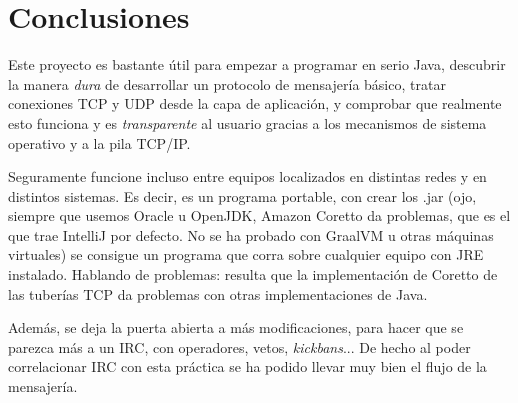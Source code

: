 \documentclass{article}
\begin{document}
\section{Conclusiones}

Este proyecto es bastante útil para empezar a programar en serio Java, descubrir la manera \textit{dura} de desarrollar un protocolo de mensajería básico, tratar conexiones TCP y UDP desde la capa de aplicación, y comprobar que realmente esto funciona y es \textit{transparente} al usuario gracias a los mecanismos de sistema operativo y a la pila TCP/IP.

Seguramente funcione incluso entre equipos localizados en distintas redes y en distintos sistemas. Es decir, es un programa portable, con crear los .jar (ojo, siempre que usemos Oracle u OpenJDK, Amazon Coretto da problemas, que es el que trae IntelliJ por defecto. No se ha probado con GraalVM u otras máquinas virtuales) se consigue un programa que corra sobre cualquier equipo con JRE instalado. Hablando de problemas: resulta que la implementación de Coretto de las tuberías TCP da problemas con otras implementaciones de Java.

Además, se deja la puerta abierta a más modificaciones, para hacer que se parezca más a un IRC, con operadores, vetos, \textit{kickbans}... De hecho al poder correlacionar IRC con esta práctica se ha podido llevar muy bien el flujo de la mensajería.
\end{document}
